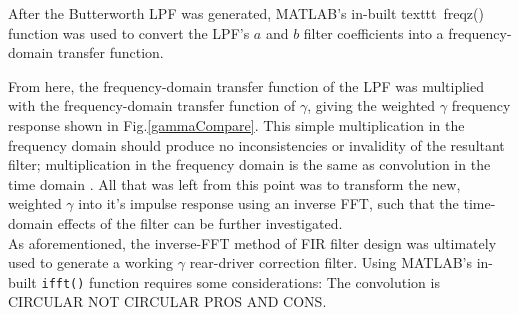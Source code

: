 \documentclass{report}
\begin{document}
            After the Butterworth LPF was generated, MATLAB's in-built texttt\ {freqz()} function was used to convert the LPF's $a$ and $b$ filter coefficients into a frequency-domain transfer function.

            From here, the frequency-domain transfer function of the LPF was multiplied with the frequency-domain transfer function of $\gamma$, giving the weighted $\gamma$ frequency response shown in Fig.\ref{gammaCompare}.
            This simple multiplication in the frequency domain should produce no inconsistencies or invalidity of the resultant filter; multiplication in the frequency domain is the same as convolution in the time domain \cite{stanfordConvolution}.
            All that was left from this point was to transform the new, weighted $\gamma$ into it's impulse response using an inverse FFT, such that the time-domain effects of the filter can be further investigated.
            \\
            As aforementioned, the inverse-FFT method of FIR filter design was ultimately used to generate a working $\gamma$ rear-driver correction filter.
            Using MATLAB's in-built \texttt{ifft()} function requires some considerations: The convolution is CIRCULAR NOT CIRCULAR PROS AND CONS.
\end{document}
